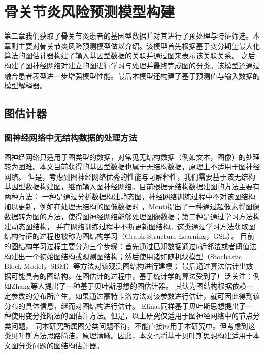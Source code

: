 \chapter{骨关节炎风险预测模型构建}
第二章我们获取了骨关节炎患者的基因型数据并对其进行了预处理与特征筛选。本章则主要对骨关节炎风险预测模型做以介绍。该模型首先根据基于变分期望最大化算法的图估计器构建了输入基因型数据的关联并通过图来表示该关联关系。
之后构建了图神经网络对建立的图进行学习与处理并最终完成图的分类。该模型还通过融合患者表型进一步增强模型性能。最后本模型还构建了基于预测值与输入数据的模型解释器。
\section{图估计器}
\subsection{图神经网络中无结构数据的处理方法}
图神经网络只适用于图类型的数据，对常见无结构数据（例如文本，图像）的处理较为困难。本文目前获得的基因型数据也属于无结构数据，原理上不适用于图神经网络。
但是，考虑到图神经网络优秀的性能与可解释性，我们需要基于该无结构基因型数据构建图，继而输入图神经网络。目前根据无结构数据建图的方法主要有两种方法：
一种是通过分析数据构建静态图，神经网络训练过程中不对该图结构加以更新\cite{hu_embedding_2017,monti_geometric_2016}，例如在处理无结构的图像数据时
，Monti\cite{monti_geometric_2016}提出了一种通过超像素将图像数据转为图的方法，使得图神经网络能够处理图像数据；第二种是通过学习方法构建动态图结构，
并在网络训练过程中不断更新图结构\cite{zhu_survey_2022}。这类通过学习方法获取图结构特征的过程也被称为图结构学习（Graph Structure Learning，GSL）。
目前的图结构学习过程主要分为三个步骤：首先通过已知数据通过k近邻法\cite{preparata_computational_1985}或者阈值法\cite{bentley_complexity_1977}
构建出一个初始图结构或观测图结构；然后使用诸如随机块模型（Stochastic Block Model，SBM）等方法\cite{holland_stochastic_1983}对该观测图结构进行建模；
最后通过算法估计出数据可能具有的图结构。在图估计的过程中，基于统计学的算法受到了广泛关注：例如Zhang\cite{zhang_bayesian_2019}等人提出了一种基于贝叶斯思想的图估计器。
其认为图结构根据依赖一定参数的分布所产生，如果通过蒙特卡洛方法对该参数进行估计，就可因此得到该分布的具体信息，继而对图结构进行估计。
Elinas\cite{elinas_variational_2020}同样基于贝叶斯思想提出了一种使用变分推断法的图估计方法。但是，以上研究仅适用于图神经网络中的节点分类问题，
同本研究所属图分类问题不符，不能直接应用于本研究中。但考虑到这类贝叶斯方法思路简洁，原理清晰。因此，本文也将基于贝叶斯思想构建适用于本文图分类问题的图结构估计器。

